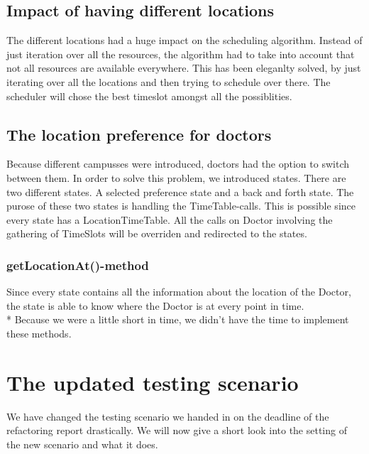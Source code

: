 \documentclass[12pt]{article}
\begin{document}
\subsection{Impact of having different locations}
The different locations had a huge impact on the scheduling algorithm. Instead of just iteration over all the resources, the algorithm had to take into account that not all resources are available everywhere. This has been eleganlty solved, by just iterating over all the locations and then trying to schedule over there. The scheduler will chose the best timeslot amongst all the possiblities.
\subsection{The location preference for doctors}
Because different campusses were introduced, doctors had the option to switch between them. In order to solve this problem, we introduced states. There are two different states. A selected preference state and a back and forth state. The purose of these two states is handling the TimeTable-calls. This is possible since every state has a LocationTimeTable. All the calls on Doctor involving the gathering of TimeSlots will be overriden and redirected to the states.
\subsubsection{getLocationAt()-method}
Since every state contains all the information about the location of the Doctor, the state is able to know where the Doctor is at every point in time.\\*
Because we were a little short in time, we didn't have the time to implement these methods.

\section{The updated testing scenario}
We have changed the testing scenario we handed in on the deadline of the refactoring report drastically. We will now give a short look into the setting of the new scenario and what it does.
\end{document}
